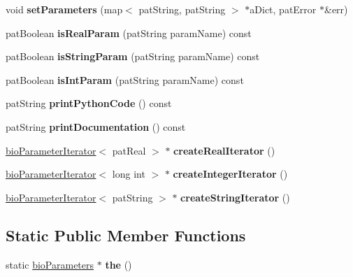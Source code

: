 \begin{DoxyCompactItemize}
\item 
\mbox{\label{classbio_parameters_a8532897d73779fbb50b92b07c0eff40e}} 
void {\bfseries set\+Parameters} (map$<$ pat\+String, pat\+String $>$ $\ast$a\+Dict, pat\+Error $\ast$\&err)
\item 
\mbox{\label{classbio_parameters_a9b1ddf642dffeabe2f77450a13fe0dc6}} 
pat\+Boolean {\bfseries is\+Real\+Param} (pat\+String param\+Name) const
\item 
\mbox{\label{classbio_parameters_a2fe6894e63adac20e732a9b1407cbf20}} 
pat\+Boolean {\bfseries is\+String\+Param} (pat\+String param\+Name) const
\item 
\mbox{\label{classbio_parameters_a180138b2bf0a6f1828bbad517a42d8a2}} 
pat\+Boolean {\bfseries is\+Int\+Param} (pat\+String param\+Name) const
\item 
\mbox{\label{classbio_parameters_a23dedc09e9a72adb885e455903831578}} 
pat\+String {\bfseries print\+Python\+Code} () const
\item 
\mbox{\label{classbio_parameters_af5898eef7aaebb9f29e5914bd0d13ac7}} 
pat\+String {\bfseries print\+Documentation} () const
\item 
\mbox{\label{classbio_parameters_ae7eb1366946bc71a7d57b3fedcfceb84}} 
\hyperlink{classbio_parameter_iterator}{bio\+Parameter\+Iterator}$<$ pat\+Real $>$ $\ast$ {\bfseries create\+Real\+Iterator} ()
\item 
\mbox{\label{classbio_parameters_aaff534304d00ff1d556786796fd0820f}} 
\hyperlink{classbio_parameter_iterator}{bio\+Parameter\+Iterator}$<$ long int $>$ $\ast$ {\bfseries create\+Integer\+Iterator} ()
\item 
\mbox{\label{classbio_parameters_a2b6cad61e7f2288414743b9869931a5a}} 
\hyperlink{classbio_parameter_iterator}{bio\+Parameter\+Iterator}$<$ pat\+String $>$ $\ast$ {\bfseries create\+String\+Iterator} ()
\end{DoxyCompactItemize}
\subsection*{Static Public Member Functions}
\begin{DoxyCompactItemize}
\item 
\mbox{\label{classbio_parameters_a9a28ea6aeb621046ce13ad936fddc4f7}} 
static \hyperlink{classbio_parameters}{bio\+Parameters} $\ast$ {\bfseries the} ()
\end{DoxyCompactItemize}
